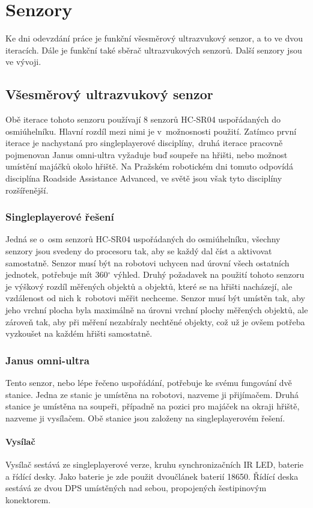 \chapter{Senzory}
Ke dni odevzdání práce je funkční všesměrový ultrazvukový senzor, a to ve dvou iteracích.
Dále je funkční také sběrač ultrazvukových senzorů.
Další senzory jsou ve vývoji.

\section{Všesměrový ultrazvukový senzor}
Obě iterace tohoto senzoru používají 8 senzorů HC-SR04 uspořádaných do osmiúhelníku.
Hlavní rozdíl mezi nimi je v~možnosnosti použití.
Zatímco první iterace je nachystaná pro singleplayerové disciplíny,~druhá iterace pracovně pojmenovan Janus omni-ultra vyžaduje buď soupeře na hřišti, nebo možnost umístění majáčků okolo hřiště. 
Na Pražském robotickém dni tomuto odpovídá disciplína Roadside Assistance Advanced, ve světě jsou však tyto disciplíny rozšířenější.

\subsection{Singleplayerové řešení}
Jedná se o~osm senzorů HC-SR04 uspořádaných do osmiúhelníku, všechny senzory jsou svedeny do procesoru tak, aby se každý dal číst a aktivovat samostatně.
Senzor musí být na robotovi uchycen nad úrovní všech ostatních jednotek, potřebuje mít 360$^{\circ}$ výhled.
Druhý požadavek na použití tohoto senzoru je výškový rozdíl měřených objektů a objektů, které se na hřišti nacházejí, ale vzdálenost od nich k~robotovi měřit nechceme.
Senzor musí být umístěn tak, aby jeho vrchní plocha byla maximálně na úrovni vrchní plochy měřených objektů, ale zároveň tak, aby při měření nezabíraly nechtěné objekty, což už je ovšem potřeba vyzkoušet na každém hřišti samostatně.

\subsection{Janus omni-ultra}
Tento senzor, nebo lépe řečeno uspořádání, potřebuje ke svému fungování dvě stanice.
Jedna ze stanic je umístěna na robotovi, nazveme ji přijímačem.
Druhá stanice je umístěna na soupeři, případně na pozici pro majáček na okraji hřiště, nazveme ji vysílačem.
Obě stanice jsou založeny na singleplayerovém řešení.

\subsubsection{Vysílač}
Vysílač sestává ze singleplayerové verze, kruhu synchronizačních IR LED, baterie a řídící desky.
Jako baterie je zde použit dvoučlánek baterií 18650.
Řídící deska sestává ze dvou DPS umístěných nad sebou, propojených šestipinovým konektorem.


